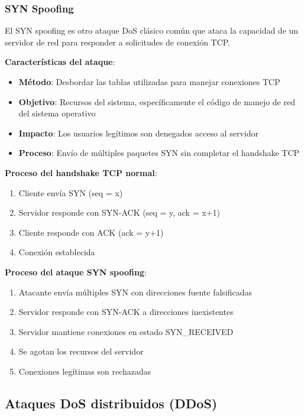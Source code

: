 \subsubsection{SYN Spoofing}

El SYN spoofing es otro ataque DoS clásico común que ataca la capacidad de un servidor de red para responder a solicitudes de conexión TCP.

\textbf{Características del ataque}:
\begin{itemize}
    \item \textbf{Método}: Desbordar las tablas utilizadas para manejar conexiones TCP
    \item \textbf{Objetivo}: Recursos del sistema, específicamente el código de manejo de red del sistema operativo
    \item \textbf{Impacto}: Los usuarios legítimos son denegados acceso al servidor
    \item \textbf{Proceso}: Envío de múltiples paquetes SYN sin completar el handshake TCP
\end{itemize}

\textbf{Proceso del handshake TCP normal}:
\begin{enumerate}
    \item Cliente envía SYN (seq = x)
    \item Servidor responde con SYN-ACK (seq = y, ack = x+1)
    \item Cliente responde con ACK (ack = y+1)
    \item Conexión establecida
\end{enumerate}

\textbf{Proceso del ataque SYN spoofing}:
\begin{enumerate}
    \item Atacante envía múltiples SYN con direcciones fuente falsificadas
    \item Servidor responde con SYN-ACK a direcciones inexistentes
    \item Servidor mantiene conexiones en estado SYN\_RECEIVED
    \item Se agotan los recursos del servidor
    \item Conexiones legítimas son rechazadas
\end{enumerate}

\subsection{Ataques DoS distribuidos (DDoS)}

